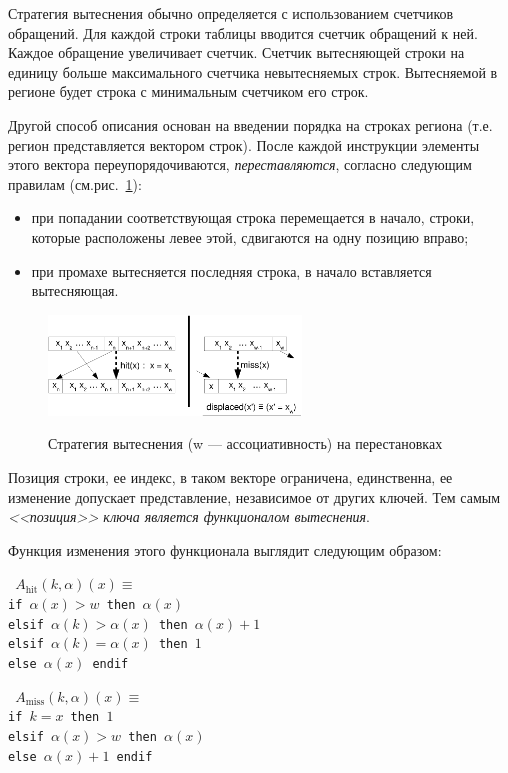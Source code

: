 Стратегия вытеснения \LRU обычно определяется с использованием
счетчиков обращений. Для каждой строки таблицы
вводится счетчик обращений к ней. Каждое обращение увеличивает
счетчик. Счетчик вытесняющей строки на единицу больше максимального счетчика невытесняемых строк. Вытесняемой в регионе будет строка с минимальным счетчиком его строк.

Другой способ описания \LRU основан на введении порядка на строках региона (т.е.
регион представляется вектором строк). После каждой инструкции элементы этого вектора переупорядочиваются, \emph{переставляются}, согласно следующим правилам (см.рис.~\ref{fig:lru1}):
\begin{itemize}
\item при попадании соответствующая строка перемещается в начало, строки, которые расположены левее этой, сдвигаются на одну позицию вправо;
\item при промахе вытесняется последняя строка, в начало вставляется вытесняющая.
\end{itemize}

\begin{figure}[h] \center
  \includegraphics[width=0.6\textwidth]{2.theor/lru1}\\
  \caption{Стратегия вытеснения \LRU (w --- ассоциативность) на
перестановках}\label{fig:lru1}
\end{figure}

Позиция строки, ее индекс, в таком векторе ограничена, единственна, ее изменение допускает представление, независимое от других ключей. Тем самым \emph{<<позиция>> ключа является функционалом вытеснения}.

Функция изменения этого функционала выглядит следующим образом:\\

\parbox{0.5\textwidth}{ \tt
$A_{\mbox{hit}}(k, \alpha)(x) \equiv$\\
if $\alpha(x) > w$ then $\alpha(x)$\\
elsif $\alpha(k) > \alpha(x)$ then $\alpha(x)+1$\\
elsif $\alpha(k) = \alpha(x)$ then $1$\\
else $\alpha(x)$ endif%
}\parbox{0.5\textwidth}{\tt
$A_{\mbox{miss}}(k, \alpha)(x) \equiv$\\
if $k = x$ then $1$\\
elsif $\alpha(x) > w$ then $\alpha(x)$\\
else $\alpha(x) + 1$ endif}\\

